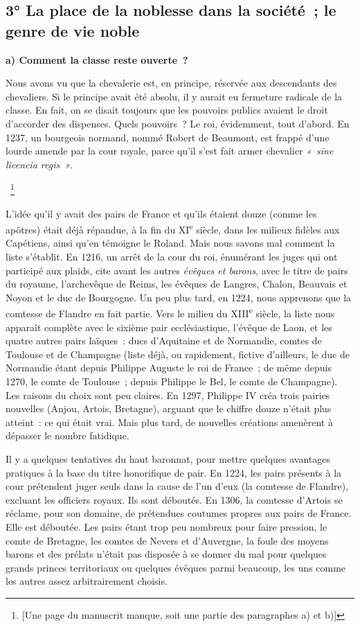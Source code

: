 \documentclass[french,twoside]{book} %
\newcommand{\labelchar}[1]{\textbf{\color{rubric} #1}}
\begin{document}
\subsection[{3° La place de la noblesse dans la société ; le genre de vie noble}]{3° La place de la noblesse dans la société ; le genre de vie noble}
\noindent \labelchar{a) Comment la classe reste ouverte ?}\par
Nous avons vu que la chevalerie est, en principe, réservée aux descendants des chevaliers. Si le principe avait été absolu, il y aurait eu fermeture radicale de la classe. En fait, on se disait toujours que les pouvoirs publics avaient le droit d’accorder des dispenses. Quels pouvoirs ? Le roi, évidemment, tout d’abord. En 1237, un bourgeois normand, nommé Robert de Beaumont, est frappé d’une lourde amende par la cour royale, parce qu’il s’est fait armer chevalier \emph{« sine licencia regis »}.\par
[…] \footnote{[Une page du manuscrit manque, soit une partie des paragraphes a) et b)]}\par
\label{p68} L’idée qu’il y avait des pairs de France et qu’ils étaient douze (comme les apôtres) était déjà répandue, à la fin du XI\textsuperscript{e} siècle, dans les milieux fidèles aux Capétiens, ainsi qu’en témoigne le Roland. Mais nous savons mal comment la liste s’établit. En 1216, un arrêt de la cour du roi, énumérant les juges qui ont participé aux plaids, cite avant les autres \emph{évêques et barons}, avec le titre de pairs du royaume, l’archevêque de Reims, les évêques de Langres, Chalon, Beauvais et Noyon et le duc de Bourgogne. Un peu plus tard, en 1224, nous apprenons que la comtesse de Flandre en fait partie. Vers le milieu du XIII\textsuperscript{e} siècle, la liste nous apparaît complète avec le sixième pair ecclésiastique, l’évêque de Laon, et les quatre autres pairs laïques : ducs d’Aquitaine et de Normandie, comtes de Toulouse et de Champagne (liste déjà, ou rapidement, fictive d’ailleurs, le duc de Normandie étant depuis Philippe Auguste le roi de France ; de même depuis 1270, le comte de Toulouse ; depuis Philippe le Bel, le comte de Champagne). Les raisons du choix sont peu claires. En 1297, Philippe IV créa trois pairies nouvelles (Anjou, Artois, Bretagne), arguant que le chiffre douze n’était plus atteint : ce qui était vrai. Mais plus tard, de nouvelles créations amenèrent à dépasser le nombre fatidique.\par
Il y a quelques tentatives du haut baronnat, pour mettre quelques avantages pratiques à la base du titre honorifique de pair. En 1224, les pairs présents à la cour prétendent juger seuls dans la cause de l’un d’eux (la comtesse de Flandre), excluant les officiers royaux. Ils sont déboutés. En 1306, la comtesse d’Artois se réclame, pour son domaine, de prétendues coutumes propres aux pairs de France. Elle est déboutée. Les pairs étant trop peu nombreux pour faire pression, le comte de Bretagne, les comtes de Nevers et d’Auvergne, la foule des moyens barons et des prélats n’était pas disposée à se donner du mal pour quelques grands princes territoriaux ou quelques évêques parmi beaucoup, les uns comme les autres assez arbitrairement choisis.\par
\end{document}
